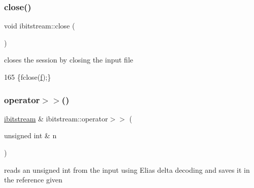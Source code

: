 \subsubsection{\texorpdfstring{close()}{close()}}
{\footnotesize\ttfamily void ibitstream\+::close (\begin{DoxyParamCaption}{ }\end{DoxyParamCaption})\hspace{0.3cm}{\ttfamily [inline]}}



closes the session by closing the input file 


\begin{DoxyCode}
165 \{fclose(\hyperlink{classibitstream_a3ea2cdd0cf97820f0e1520c42e364308}{f});\}
\end{DoxyCode}
\mbox{\label{classibitstream_ae3e91ecc9ff17eef98d72d44aec02eca}} 
\subsubsection{\texorpdfstring{operator$>$$>$()}{operator>>()}\hspace{0.1cm}{\footnotesize\ttfamily [1/2]}}
{\footnotesize\ttfamily \hyperlink{classibitstream}{ibitstream} \& ibitstream\+::operator$>$$>$ (\begin{DoxyParamCaption}\item[{unsigned int \&}]{n }\end{DoxyParamCaption})}



reads an unsigned int from the input using Elias delta decoding and saves it in the reference given 


